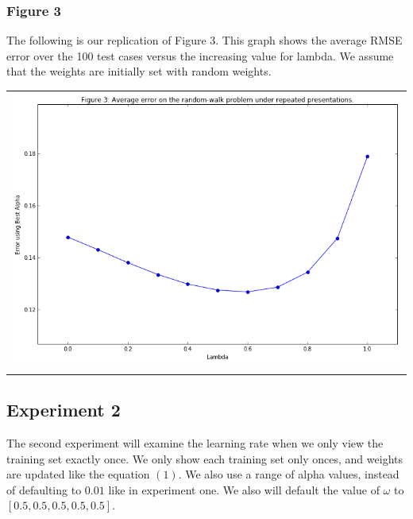 \documentclass{article}
\begin{document}
\subsubsection{Figure 3}
\label{sec:orgheadline5}
The following is our replication of Figure 3. This graph shows the
average RMSE error over the 100 test cases versus the increasing value
for lambda. We assume that the weights are initially set with random
weights. 

\begin{center}
\begin{tabular}{l}
\hline
\includegraphics[width=.9\linewidth]{figure3_1.png}\\
\\
\end{tabular}
\end{center}

\subsection{Experiment 2}
\label{sec:orgheadline9}
The second experiment will examine the learning rate when we only view
the training set exactly once. We only show each training set only
onces, and weights are updated like the equation \((1)\). We also use a
range of alpha values, instead of defaulting to \(0.01\) like in
experiment one. We also will default the value of \(\omega\) to \([0.5,
0.5, 0.5, 0.5, 0.5]\).
\end{document}

